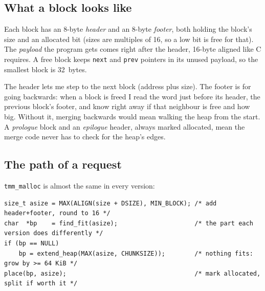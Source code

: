 \documentclass[11pt,letterpaper]{article}
\begin{document}
\subsection*{What a block looks like}

Each block has an 8-byte \emph{header} and an 8-byte \emph{footer}, both holding the block's size and an allocated bit (sizes are multiples of 16, so a low bit is free for that). The \emph{payload} the program gets comes right after the header, 16-byte aligned like C requires. A free block keeps \texttt{next} and \texttt{prev} pointers in its unused payload, so the smallest block is 32~bytes.

\begin{center}
\end{center}

The header lets me step to the next block (address plus size). The footer is for going backwards: when a block is freed I read the word just before its header, the previous block's footer, and know right away if that neighbour is free and how big. Without it, merging backwards would mean walking the heap from the start. A \emph{prologue} block and an \emph{epilogue} header, always marked allocated, mean the merge code never has to check for the heap's edges.

\subsection*{The path of a request}

\texttt{tmm\_malloc} is almost the same in every version:

\begin{lstlisting}
size_t asize = MAX(ALIGN(size + DSIZE), MIN_BLOCK); /* add header+footer, round to 16 */
char  *bp    = find_fit(asize);                     /* the part each version does differently */
if (bp == NULL)
	bp = extend_heap(MAX(asize, CHUNKSIZE));        /* nothing fits: grow by >= 64 KiB */
place(bp, asize);                                   /* mark allocated, split if worth it */
\end{lstlisting}
\end{document}
